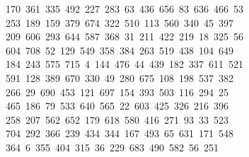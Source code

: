 \begin{tabbing}
\>\ 170\ 361\ 335\ 492\ 227\ 283\ 63\ 436\ 656\ 83\ 636\ 466\ 53\\[0pt]
\ 253\ 189\ 159\ 379\ 674\ 322\ 510\ 113\ 560\ 340\ 45\ 397\\[0pt]
\>\ 209\ 606\ 293\ 644\ 587\ 368\ 31\ 211\ 422\ 219\ 18\ 325\ 56\\[0pt]
\ 604\ 708\ 52\ 129\ 549\ 358\ 384\ 263\ 519\ 438\ 104\ 649\\[0pt]
\>\ 184\ 243\ 575\ 715\ 4\ 144\ 476\ 44\ 439\ 182\ 337\ 611\ 521\\[0pt]
\>\ 591\ 128\ 389\ 670\ 330\ 49\ 280\ 675\ 108\ 198\ 537\ 382\ \\[0pt]
\ 266\ 29\ 690\ 453\ 121\ 697\ 154\ 393\ 503\ 116\ 294\ 25\\[0pt]
\ 465\ 186\ 79\ 533\ 640\ 565\ 22\ 603\ 425\ 326\ 216\ 396\ \\[0pt]
\ 258\ 207\ 562\ 652\ 179\ 618\ 580\ 416\ 271\ 93\ 33\ 523\\[0pt]
\>\ 704\ 292\ 366\ 239\ 434\ 344\ 167\ 493\ 65\ 631\ 171\ 548\ \\[0pt]
\ 364\ 6\ 355\ 404\ 315\ 36\ 229\ 683\ 490\ 582\ 56\ 251\ \\[0pt]

\end{tabbing}
